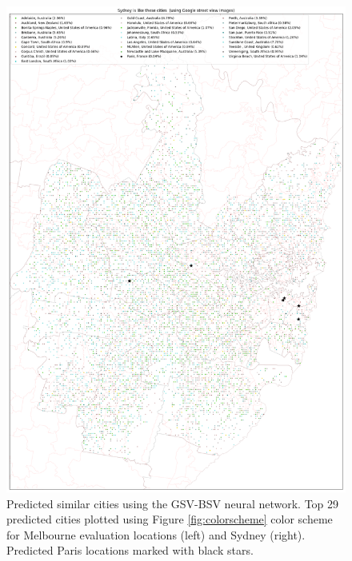 \documentclass[sageh,times]{sagej}
\begin{document}
\begin{figure}[!htbp]
\includegraphics[scale=0.15]{Images/SydneyOverallAbrev_street.png}  
\caption{Predicted similar cities using the GSV-BSV neural network. Top 29 predicted cities plotted using Figure \ref{fig:colorscheme} color scheme for Melbourne evaluation locations (left) and Sydney (right). Predicted Paris locations marked with black stars.}   
 \label{fig:melstreet}  
\end{figure} 

\end{document}
